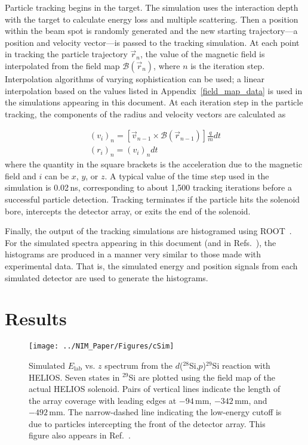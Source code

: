 Particle tracking begins in the target.  The simulation uses the interaction depth with the target to calculate energy loss and multiple scattering. Then a position within the beam spot is randomly generated and the new starting trajectory---a position and velocity vector---is passed to the tracking simulation.  At each point in tracking  the particle trajectory $\vec{r}_{n}$, the value of the magnetic field is interpolated from the field map $\mathscr{B}(\vec{r}_{n})$, where $n$ is the iteration step.  Interpolation algorithms of varying sophistication can be used; a linear interpolation based on the values listed in Appendix~\ref{field_map_data} is used in the simulations appearing in this document.  At each iteration step in the particle tracking, the components of the radius and velocity vectors are calculated as

\begin{subequations}
\label{sim_setp}
\begin{eqnarray}
(v_i)_n=\left[\vec{v}_{n-1} \times \mathscr{B}(\vec{r}_{n-1})\right] \frac{q}{m}dt \label{r_step}\\
(r_i)_n=(v_i)_n dt \label{v_step}
\end{eqnarray}
\end{subequations}
where the quantity in the square brackets is the acceleration due to the magnetic field and $i$ can be $x$, $y$, or $z$.
A typical value of the time step used in the simulation is 0.02\,ns, corresponding to about 1,500 tracking iterations before a successful particle detection.  Tracking terminates if the particle hits the solenoid bore, intercepts the detector array, or exits the end of the solenoid.

Finally, the output of the tracking simulations are histogramed using ROOT~\cite{Brun_1998}.  For the simulated spectra appearing in this document (and in Refs.~\cite{Wuosmaa_2007, Lighthall_2010}), the histograms are produced in a manner very similar to those made with  experimental data.  That is, the simulated energy and position signals from each simulated detector are used to generate the histograms. 

\section{Results}
\begin{figure}[ht]
	\centering
	\texttt{[image: ../NIM\_Paper/Figures/cSim]}
	\caption[Simulated $E_\mathrm{lab}$ vs. $z$ spectrum from the $d$($^{28}$Si,$p$)$^{29}$Si reaction with HELIOS]{Simulated $E_\mathrm{lab}$ vs. $z$ spectrum from the $d$($^{28}$Si,$p$)$^{29}$Si reaction with HELIOS.  Seven states in $^{29}$Si are plotted using the field map of the actual HELIOS solenoid.  Pairs of vertical lines indicate the length of the array coverage with leading edges at $-94$\,mm, $-342$\,mm, and $-492$\,mm.  %
	The narrow-dashed line indicating the low-energy cutoff is due to particles intercepting the front of the detector array. This figure also appears in Ref.~\cite{Lighthall_2010}.}
\label{sim_plots}
\end{figure}


